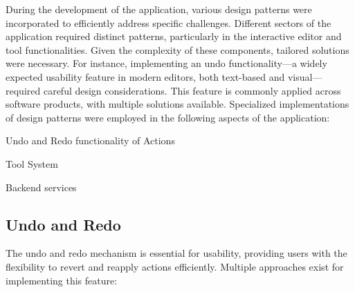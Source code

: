 During the development of the application, various design patterns were incorporated to efficiently address specific challenges. Different sectors of the application required distinct patterns, particularly in the interactive editor and tool functionalities. Given the complexity of these components, tailored solutions were necessary. For instance, implementing an undo functionality—a widely expected usability feature in modern editors, both text-based and visual—required careful design considerations. This feature is commonly applied across software products, with multiple solutions available. Specialized implementations of design patterns were employed in the following aspects of the application:
\begin{compactitem}
\item Undo and Redo functionality of Actions
\item Tool System
\item Backend services
\end{compactitem}

\subsection{Undo and Redo}
\label{sec:undo-redo}

The undo and redo mechanism is essential for usability, providing users with the flexibility to revert and reapply actions efficiently. Multiple approaches exist for implementing this feature:

